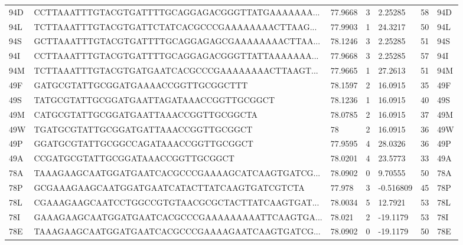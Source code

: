\begin{tabular}{lllllll}
94D &  CCTTAAATTTGTACGTGATTTTGCAGGAGACGGGTTATGAAAAAAA... &  77.9668 &         3 &   2.25285 &     58 &  94D \\
94L &  TCTTAAATTTGTACGTGATTCTATCACGCCCGAAAAAAAACTTAAG... &  77.9903 &         1 &   24.3217 &     50 &  94L \\
94S &  GCTTAAATTTGTACGTGATTTTGCAGGAGAGCGAAAAAAAACTTAA... &  78.1246 &         3 &   2.25285 &     51 &  94S \\
94I &  CCTTAAATTTGTACGTGATTTTGCAGGAGACGGGTTATTAAAAAAA... &  77.9668 &         3 &   2.25285 &     57 &  94I \\
94M &  TCTTAAATTTGTACGTGATGAATCACGCCCGAAAAAAAACTTAAGT... &  77.9665 &         1 &   27.2613 &     51 &  94M \\
49F &                GATGCGTATTGCGGATGAAAACCGGTTGCGGCTTT &  78.1597 &         2 &   16.0915 &     35 &  49F \\
49S &           TATGCGTATTGCGGATGAATTAGATAAACCGGTTGCGGCT &  78.1236 &         1 &   16.0915 &     40 &  49S \\
49M &              CATGCGTATTGCGGATGAATTAAACCGGTTGCGGCTA &  78.0785 &         2 &   16.0915 &     37 &  49M \\
49W &               TGATGCGTATTGCGGATGATTAAACCGGTTGCGGCT &       78 &         2 &   16.0915 &     36 &  49W \\
49P &               GGATGCGTATTGCGGCCAGATAAACCGGTTGCGGCT &  77.9595 &         4 &   28.0326 &     36 &  49P \\
49A &                  CCGATGCGTATTGCGGATAAACCGGTTGCGGCT &  78.0201 &         4 &   23.5773 &     33 &  49A \\
78A &  TAAAGAAGCAATGGATGAATCACGCCCGAAAAGCATCAAGTGATCG... &  78.0902 &         0 &   9.70555 &     50 &  78A \\
78P &      GCGAAAGAAGCAATGGATGAATCATACTTATCAAGTGATCGTCTA &   77.978 &         3 & -0.516809 &     45 &  78P \\
78L &  CGAAAGAAGCAATCCTGGCCGTGTAACGCGCTACTTATCAAGTGAT... &  78.0034 &         5 &   12.7921 &     53 &  78L \\
78I &  GAAAGAAGCAATGGATGAATCACGCCCGAAAAAAAAATTCAAGTGA... &   78.021 &         2 &  -19.1179 &     53 &  78I \\
78E &  TAAAGAAGCAATGGATGAATCACGCCCGAAAAGAATCAAGTGATCG... &  78.0902 &         0 &  -19.1179 &     50 &  78E \\
\bottomrule
\end{tabular}
